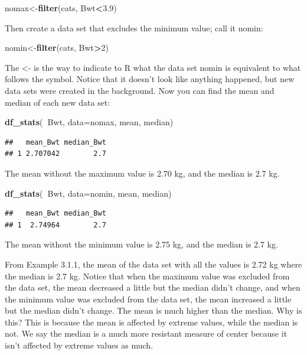 \documentclass[
]{book}
\newenvironment{Shaded}{\begin{snugshade}}{\end{snugshade}}
\newcommand{\DataTypeTok}[1]{\textcolor[rgb]{0.13,0.29,0.53}{#1}}
\newcommand{\DecValTok}[1]{\textcolor[rgb]{0.00,0.00,0.81}{#1}}
\newcommand{\FloatTok}[1]{\textcolor[rgb]{0.00,0.00,0.81}{#1}}
\newcommand{\KeywordTok}[1]{\textcolor[rgb]{0.13,0.29,0.53}{\textbf{#1}}}
\newcommand{\NormalTok}[1]{#1}
\newcommand{\OperatorTok}[1]{\textcolor[rgb]{0.81,0.36,0.00}{\textbf{#1}}}
\begin{document}
\begin{Shaded}
\begin{Highlighting}[]
\NormalTok{nomax<-}\KeywordTok{filter}\NormalTok{(cats, Bwt}\OperatorTok{<}\FloatTok{3.9}\NormalTok{)}
\end{Highlighting}
\end{Shaded}

Then create a data set that excludes the minimum value; call it nomin:

\begin{Shaded}
\begin{Highlighting}[]
\NormalTok{nomin<-}\KeywordTok{filter}\NormalTok{(cats, Bwt}\OperatorTok{>}\DecValTok{2}\NormalTok{)}
\end{Highlighting}
\end{Shaded}

The \textless- is the way to indicate to R what the data set nomin is equivalent to what follows the symbol. Notice that it doesn't look like anything happened, but new data sets were created in the background. Now you can find the mean and median of each new data set:

\begin{Shaded}
\begin{Highlighting}[]
\KeywordTok{df_stats}\NormalTok{(}\OperatorTok{~}\NormalTok{Bwt, }\DataTypeTok{data=}\NormalTok{nomax, mean, median)}
\end{Highlighting}
\end{Shaded}

\begin{verbatim}
##   mean_Bwt median_Bwt
## 1 2.707042        2.7
\end{verbatim}

The mean without the maximum value is 2.70 kg, and the median is 2.7 kg.

\begin{Shaded}
\begin{Highlighting}[]
\KeywordTok{df_stats}\NormalTok{(}\OperatorTok{~}\NormalTok{Bwt, }\DataTypeTok{data=}\NormalTok{nomin, mean, median)}
\end{Highlighting}
\end{Shaded}

\begin{verbatim}
##   mean_Bwt median_Bwt
## 1  2.74964        2.7
\end{verbatim}

The mean without the minimum value is 2.75 kg, and the median is 2.7 kg.

From Example 3.1.1, the mean of the data set with all the values is 2.72 kg where the median is 2.7 kg. Notice that when the maximum value was excluded from the data set, the mean decreased a little but the median didn't change, and when the minimum value was excluded from the data set, the mean increased a little but the median didn't change. The mean is much higher than the median. Why is this? This is because the mean is affected by extreme values, while the median is not. We say the median is a much more resistant measure of center because it isn't affected by extreme values as much.
\end{document}
